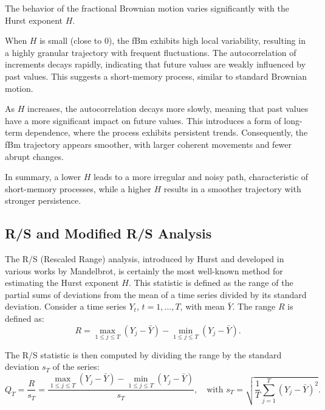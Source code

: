 \documentclass[11pt]{extarticle}
\begin{document}
\FloatBarrier

The behavior of the fractional Brownian motion varies significantly with the Hurst exponent \( H \).

When \( H \) is small (close to 0), the fBm exhibits high local variability, resulting in a highly granular trajectory with frequent fluctuations. The autocorrelation of increments decays rapidly, indicating that future values are weakly influenced by past values. This suggests a short-memory process, similar to standard Brownian motion.

As \( H \) increases, the autocorrelation decays more slowly, meaning that past values have a more significant impact on future values. This introduces a form of long-term dependence, where the process exhibits persistent trends. Consequently, the fBm trajectory appears smoother, with larger coherent movements and fewer abrupt changes.

In summary, a lower \( H \) leads to a more irregular and noisy path, characteristic of short-memory processes, while a higher \( H \) results in a smoother trajectory with stronger persistence.

\subsection{R/S and Modified R/S Analysis}

The R/S (Rescaled Range) analysis, introduced by Hurst and developed in various works by Mandelbrot, is certainly the most well-known method for estimating the Hurst exponent \(H\). This statistic is defined as the range of the partial sums of deviations from the mean of a time series divided by its standard deviation. Consider a time series \(Y_t\), \(t = 1, \dots, T\), with mean \(\bar{Y}\). The range \(R\) is defined as:
\begin{equation}
    R = \max_{1 \leq j \leq T} \left( Y_j - \bar{Y} \right) - \min_{1 \leq j \leq T} \left( Y_j - \bar{Y} \right).
\end{equation}

The R/S statistic is then computed by dividing the range by the standard deviation \(s_T\) of the series:
\begin{equation}
    Q_T = \frac{R}{s_T} = \frac{\max_{1 \leq j \leq T} \left( Y_j - \bar{Y} \right) - \min_{1 \leq j \leq T} \left( Y_j - \bar{Y} \right)}{s_T}, \quad \text{with } s_T = \sqrt{\frac{1}{T} \sum_{j=1}^{T} \left( Y_j - \bar{Y} \right)^2}.
\end{equation}
\end{document}

